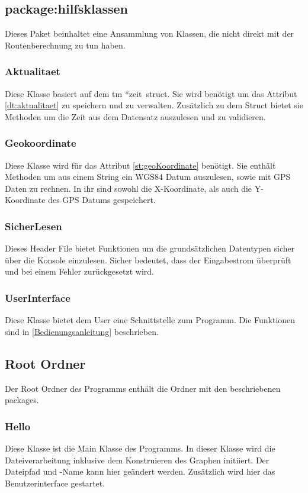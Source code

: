 \documentclass[12pt, a4paper, ngerman]{article}
\begin{document}
\subsection{package:hilfsklassen}
Dieses Paket beinhaltet eine Ansammlung von Klassen, die nicht direkt mit der Routenberechnung zu tun haben.
\subsubsection{Aktualitaet \label{class:Aktualitaet}}
Diese Klasse basiert auf dem \glqq tm *zeit\grqq~struct. Sie wird benötigt um das Attribut \ref{dt:aktualitaet} zu speichern und zu verwalten. Zusätzlich zu dem Struct bietet sie Methoden um die Zeit aus dem Datensatz auszulesen und zu validieren.

\subsubsection{Geokoordinate}
Diese Klasse wird für das Attribut \ref{st:geoKoordinate} benötigt. Sie enthält Methoden um aus einem String ein WGS84 Datum auszulesen, sowie mit GPS Daten zu rechnen. In ihr sind sowohl die X-Koordinate, als auch die Y-Koordinate des GPS Datums gespeichert.

\subsubsection{SicherLesen}
Dieses Header File bietet Funktionen um die grundsätzlichen Datentypen sicher über die Konsole einzulesen. Sicher bedeutet, dass der Eingabestrom überprüft und bei einem Fehler zurückgesetzt wird.


\subsubsection{UserInterface}
Diese Klasse bietet dem User eine Schnittstelle zum Programm. Die Funktionen sind in \ref{Bedienungsanleitung} beschrieben.


\subsection{Root Ordner}
Der Root Ordner des Programms enthält die Ordner mit den beschriebenen packages.

\subsubsection{Hello \label{hello}}
Diese Klasse ist die Main Klasse des Programms. In dieser Klasse wird die Dateiverarbeitung inklusive dem Konstruieren des Graphen initiiert. Der Dateipfad und -Name kann hier geändert werden. Zusätzlich wird hier das Benutzerinterface gestartet.
\end{document}
